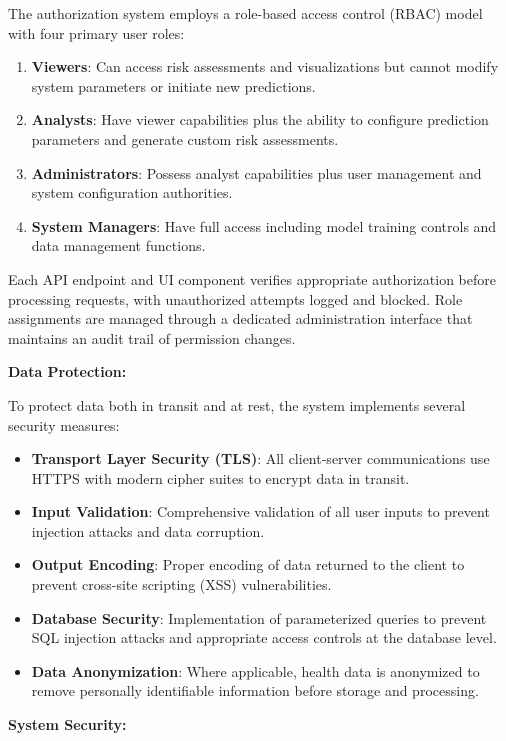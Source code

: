 \documentclass[12pt,a4paper]{report}
\begin{document}
The authorization system employs a role-based access control (RBAC) model with four primary user roles:

\begin{enumerate}
    \item \textbf{Viewers}: Can access risk assessments and visualizations but cannot modify system parameters or initiate new predictions.
    \item \textbf{Analysts}: Have viewer capabilities plus the ability to configure prediction parameters and generate custom risk assessments.
    \item \textbf{Administrators}: Possess analyst capabilities plus user management and system configuration authorities.
    \item \textbf{System Managers}: Have full access including model training controls and data management functions.
\end{enumerate}

Each API endpoint and UI component verifies appropriate authorization before processing requests, with unauthorized attempts logged and blocked. Role assignments are managed through a dedicated administration interface that maintains an audit trail of permission changes.

\textbf{Data Protection:}

To protect data both in transit and at rest, the system implements several security measures:

\begin{itemize}
    \item \textbf{Transport Layer Security (TLS)}: All client-server communications use HTTPS with modern cipher suites to encrypt data in transit.
    \item \textbf{Input Validation}: Comprehensive validation of all user inputs to prevent injection attacks and data corruption.
    \item \textbf{Output Encoding}: Proper encoding of data returned to the client to prevent cross-site scripting (XSS) vulnerabilities.
    \item \textbf{Database Security}: Implementation of parameterized queries to prevent SQL injection attacks and appropriate access controls at the database level.
    \item \textbf{Data Anonymization}: Where applicable, health data is anonymized to remove personally identifiable information before storage and processing.
\end{itemize}

\textbf{System Security:}
\end{document}
